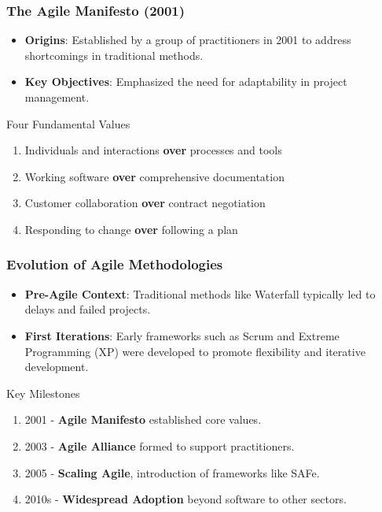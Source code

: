 \documentclass{beamer}
\begin{document}
\begin{frame}[fragile]
    \frametitle{The Agile Manifesto (2001)}
    \begin{itemize}
        \item \textbf{Origins}: Established by a group of practitioners in 2001 to address shortcomings in traditional methods.
        \item \textbf{Key Objectives}: Emphasized the need for adaptability in project management.
    \end{itemize}
    
    \begin{block}{Four Fundamental Values}
        \begin{enumerate}
            \item Individuals and interactions \textbf{over} processes and tools
            \item Working software \textbf{over} comprehensive documentation
            \item Customer collaboration \textbf{over} contract negotiation
            \item Responding to change \textbf{over} following a plan
        \end{enumerate}
    \end{block}
\end{frame}

\begin{frame}[fragile]
    \frametitle{Evolution of Agile Methodologies}
    \begin{itemize}
        \item \textbf{Pre-Agile Context}: Traditional methods like Waterfall typically led to delays and failed projects.
        \item \textbf{First Iterations}: Early frameworks such as Scrum and Extreme Programming (XP) were developed to promote flexibility and iterative development.
    \end{itemize}

    \begin{block}{Key Milestones}
        \begin{enumerate}
            \item 2001 - \textbf{Agile Manifesto} established core values.
            \item 2003 - \textbf{Agile Alliance} formed to support practitioners.
            \item 2005 - \textbf{Scaling Agile}, introduction of frameworks like SAFe.
            \item 2010s - \textbf{Widespread Adoption} beyond software to other sectors.
        \end{enumerate}
    \end{block}
\end{frame}
\end{document}
